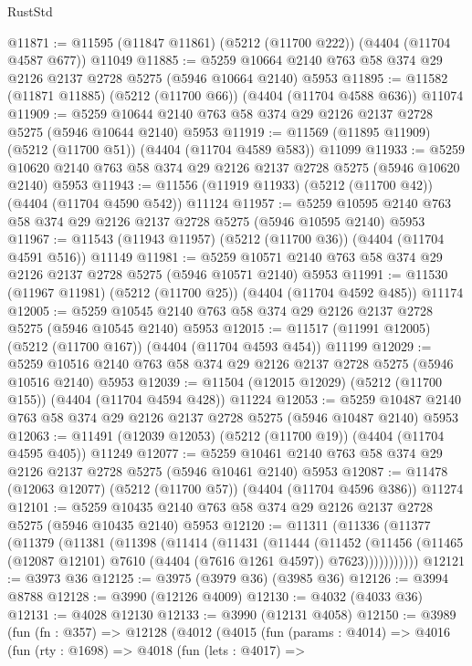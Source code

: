 \begin{lexlean}{RustStd}
\begin{coremodule}
{\begin{coremodule}
{{{{{{{{{{{{{{{{@11871 := @11595 (@11847 @11861) (@5212 (@11700 @222)) (@4404 (@11704 @4587 @677)) @11049
@11885 := @5259 @10664 @2140 @763 @58 @374 @29 @2126 @2137 @2728 @5275 (@5946 @10664 @2140) @5953
@11895 := @11582 (@11871 @11885) (@5212 (@11700 @66)) (@4404 (@11704 @4588 @636)) @11074
@11909 := @5259 @10644 @2140 @763 @58 @374 @29 @2126 @2137 @2728 @5275 (@5946 @10644 @2140) @5953
@11919 := @11569 (@11895 @11909) (@5212 (@11700 @51)) (@4404 (@11704 @4589 @583)) @11099
@11933 := @5259 @10620 @2140 @763 @58 @374 @29 @2126 @2137 @2728 @5275 (@5946 @10620 @2140) @5953
@11943 := @11556 (@11919 @11933) (@5212 (@11700 @42)) (@4404 (@11704 @4590 @542)) @11124
@11957 := @5259 @10595 @2140 @763 @58 @374 @29 @2126 @2137 @2728 @5275 (@5946 @10595 @2140) @5953
@11967 := @11543 (@11943 @11957) (@5212 (@11700 @36)) (@4404 (@11704 @4591 @516)) @11149
@11981 := @5259 @10571 @2140 @763 @58 @374 @29 @2126 @2137 @2728 @5275 (@5946 @10571 @2140) @5953
@11991 := @11530 (@11967 @11981) (@5212 (@11700 @25)) (@4404 (@11704 @4592 @485)) @11174
@12005 := @5259 @10545 @2140 @763 @58 @374 @29 @2126 @2137 @2728 @5275 (@5946 @10545 @2140) @5953
@12015 := @11517 (@11991 @12005) (@5212 (@11700 @167)) (@4404 (@11704 @4593 @454)) @11199
@12029 := @5259 @10516 @2140 @763 @58 @374 @29 @2126 @2137 @2728 @5275 (@5946 @10516 @2140) @5953
@12039 := @11504 (@12015 @12029) (@5212 (@11700 @155)) (@4404 (@11704 @4594 @428)) @11224
@12053 := @5259 @10487 @2140 @763 @58 @374 @29 @2126 @2137 @2728 @5275 (@5946 @10487 @2140) @5953
@12063 := @11491 (@12039 @12053) (@5212 (@11700 @19)) (@4404 (@11704 @4595 @405)) @11249
@12077 := @5259 @10461 @2140 @763 @58 @374 @29 @2126 @2137 @2728 @5275 (@5946 @10461 @2140) @5953
@12087 := @11478 (@12063 @12077) (@5212 (@11700 @57)) (@4404 (@11704 @4596 @386)) @11274
@12101 := @5259 @10435 @2140 @763 @58 @374 @29 @2126 @2137 @2728 @5275 (@5946 @10435 @2140) @5953
@12120 := @11311
    (@11336
      (@11377
        (@11379
          (@11381
            (@11398
              (@11414
                (@11431
                  (@11444
                    (@11452
                      (@11456
                        (@11465 (@12087 @12101) @7610 (@4404 (@7616 @1261 @4597)) @7623)))))))))))
@12121 := @3973 @36
@12125 := @3975 (@3979 @36) (@3985 @36)
@12126 := @3994 @8788
@12128 := @3990 (@12126 @4009)
@12130 := @4032 (@4033 @36)
@12131 := @4028 @12130
@12133 := @3990 (@12131 @4058)
@12150 := @3989
    (fun (fn : @357) =>
    @12128
      (@4012
        (@4015
          (fun (params : @4014) =>
          @4016
            (fun (rty : @1698) =>
            @4018
              (fun (lets : @4017) =>
}}}}}}}}}}}}}}}}
\end{coremodule}}
\end{coremodule}
\end{lexlean}
